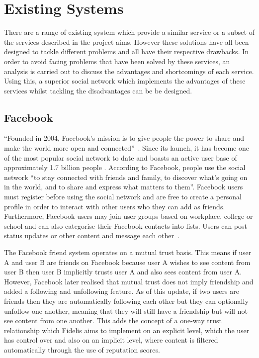 \section{Existing Systems}
There are a range of existing system which provide a similar service or a subset of the services described in the project aims. However these solutions have all been designed to tackle different problems and all have their respective drawbacks. In order to avoid facing problems that have been solved by these services, an analysis is carried out to discuss the advantages and shortcomings of each service. Using this, a superior social network which implements the advantages of these services whilst tackling the disadvantages can be be designed.

\subsection{Facebook}
``Founded in 2004, Facebook's mission is to give people the power to share and make the world more open and connected''~\cite{Facebook:About}. Since its launch, it has become one of the most popular social network to date and boasts an active user base of approximately 1.7 billion people \cite{Statista:Facebook}. According to Facebook, people use the social network ``to stay connected with friends and family, to discover what's going on in the world, and to share and express what matters to them''. Facebook users must register before using the social network and are free to create a personal profile in order to interact with other users who they can add as friends. Furthermore, Facebook users may join user groups based on workplace, college or school and can also categorise their Facebook contacts into lists. Users can post status updates or other content and message each other~\cite{Statista:Facebook}. 

The Facebook friend system operates on a mutual trust basis. This means if user A and user B are friends on Facebook because user A wishes to see content from user B then user B implicitly trusts user A and also sees content from user A. However, Facebook later realised that mutual trust does not imply friendship and added a following and unfollowing feature. As of this update, if two users are friends then they are automatically following each other but they can optionally unfollow one another, meaning that they will still have a friendship but will not see content from one another. This adds the concept of a one-way trust relationship which Fidelis aims to implement on an explicit level, which the user has control over and also on an implicit level, where content is filtered automatically through the use of reputation scores.

